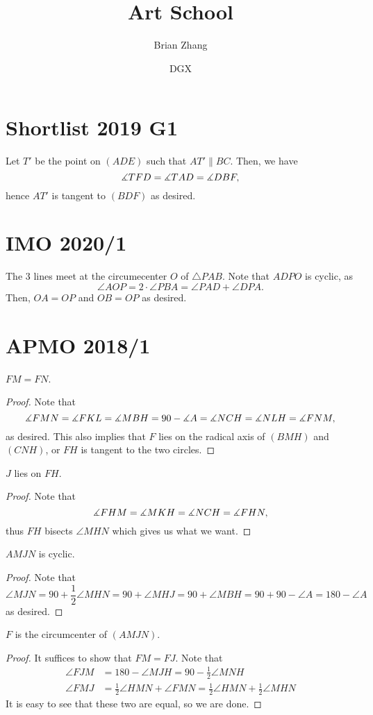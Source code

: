 \documentclass[11pt]{scrartcl}
\title{Art School}
\author{Brian Zhang}
\date{DGX}
\begin{document}
\maketitle

\section{Shortlist 2019 G1}
Let $T'$ be the point on $(ADE)$ such that $AT' \parallel BC$. Then, we have \[\measuredangle TFD = \measuredangle TAD = \measuredangle DBF,\] hence $AT'$ is tangent to $(BDF)$ as desired.

\section{IMO 2020/1}
The 3 lines meet at the circumecenter $O$ of $\triangle PAB$. Note that $ADPO$ is cyclic, as \[\angle AOP = 2 \cdot \angle PBA = \angle PAD + \angle DPA.\] Then, $OA=OP$ and $OB=OP$ as desired.

\section{APMO 2018/1}
\begin{claim}
$FM=FN$.
\end{claim}
\begin{proof}
Note that \[\measuredangle FMN = \measuredangle FKL = \measuredangle MBH = 90 - \measuredangle A = \measuredangle NCH = \measuredangle NLH = \measuredangle FNM,\]
as desired. This also implies that $F$ lies on the radical axis of $(BMH)$ and $(CNH)$, or $FH$ is tangent to the two circles.
\end{proof}

\begin{claim}
$J$ lies on $FH$.
\end{claim}
\begin{proof}
Note that \[\measuredangle FHM = \measuredangle MKH = \measuredangle NCH = \measuredangle FHN,\] thus $FH$ bisects $\angle MHN$ which gives us what we want.
\end{proof}

\begin{claim}
$AMJN$ is cyclic.
\end{claim}
\begin{proof}
Note that \[\angle MJN = 90 + \frac12 \angle MHN = 90 + \angle MHJ = 90 + \angle MBH = 90 + 90 - \angle A = 180-\angle A\] as desired.
\end{proof}

\begin{claim}
$F$ is the circumcenter of $(AMJN)$.
\end{claim}
\begin{proof}
It suffices to show that $FM=FJ$. Note that
\begin{align*}
\angle FJM &= 180 - \angle MJH = 90 - \frac 12 \angle MNH \\
\angle FMJ &= \frac 12 \angle HMN + \angle FMN = \frac 12 \angle HMN + \frac 12 \angle MHN
\end{align*}
It is easy to see that these two are equal, so we are done.
\end{proof}
\end{document}
